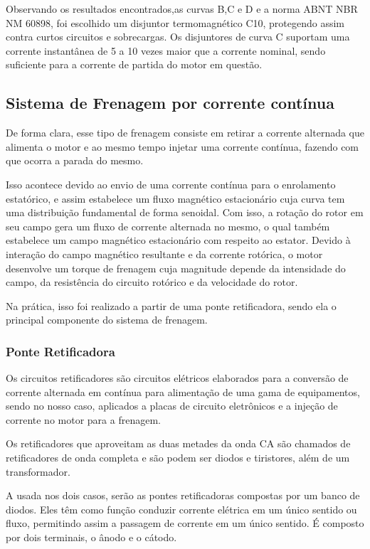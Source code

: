 Observando os resultados encontrados,as curvas B,C e D e a norma ABNT NBR NM 60898, foi escolhido um disjuntor termomagnético C10, protegendo assim contra curtos circuitos e sobrecargas. Os disjuntores de curva C suportam uma corrente instantânea de 5 a 10 vezes maior que a corrente nominal, sendo suficiente para a corrente de partida do motor em questão. 

\subsection{Sistema de Frenagem por corrente contínua}
De forma clara, esse tipo de frenagem consiste em retirar a corrente alternada que alimenta o motor e ao mesmo tempo injetar uma corrente contínua, fazendo com que ocorra a parada do mesmo. 

Isso acontece devido ao envio de uma corrente contínua para o enrolamento estatórico, e assim estabelece um fluxo magnético estacionário cuja curva tem uma distribuição fundamental de forma senoidal. Com isso, a rotação do rotor em seu campo gera um fluxo de corrente alternada no mesmo, o qual também estabelece um campo magnético estacionário com respeito ao estator. Devido à interação do campo magnético resultante e da corrente rotórica, o motor desenvolve um torque de frenagem cuja magnitude depende da intensidade do campo, da resistência do circuito rotórico e da velocidade do rotor.

Na prática, isso foi realizado a partir de uma ponte retificadora, sendo ela o principal componente do sistema de frenagem.

\subsubsection{Ponte Retificadora}
Os circuitos retificadores são circuitos elétricos elaborados para a conversão de corrente alternada em contínua para alimentação de uma gama de equipamentos, sendo no nosso caso, aplicados a placas de circuito eletrônicos e a injeção de corrente no motor para a frenagem. 

Os retificadores que aproveitam as duas metades da onda CA são chamados de retificadores de onda completa e são podem ser diodos e tiristores, além de um transformador.

A usada nos dois casos, serão as pontes retificadoras compostas por um banco de diodos. Eles têm como função conduzir corrente elétrica em um único sentido ou fluxo, permitindo assim a passagem de corrente em um único sentido. É composto por dois terminais, o ânodo e o cátodo. 

